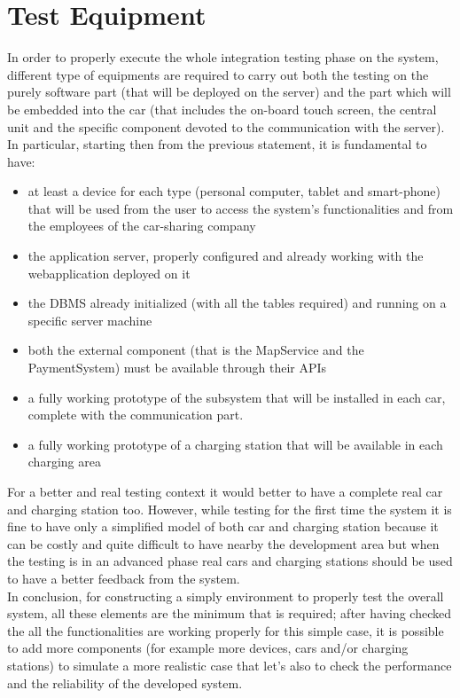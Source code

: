 \documentclass[11pt,a4paper]{report}
\begin{document}
\section{Test Equipment}
In order to properly execute the whole integration testing phase on the system, different type of equipments are required to carry out both the testing on the purely software part (that will be deployed on the server) and the part which will be embedded into the car (that includes the on-board touch screen, the central unit and the specific component devoted to the communication with the server). \\
In particular, starting then from the previous statement, it is fundamental to have:
\begin{itemize}
	\item at least a device for each type (personal computer, tablet and smart-phone) that will be used from the user to access the system's functionalities and from the employees of the car-sharing company
	\item the application server, properly configured and already working with the webapplication deployed on it
	\item the DBMS already initialized (with all the tables required) and running on a specific server machine
	\item both the external component (that is the MapService and the PaymentSystem) must be available through their APIs
	\item a fully working prototype of the subsystem that will be installed in each car, complete with the communication part.
	\item a fully working prototype of a charging station that will be available in each charging area
\end{itemize}
For a better and real testing context it would better to have a complete real car and charging station too. However, while testing for the first time the system it is fine to have only a simplified model of both car and charging station because it can be costly and quite difficult to have nearby the development area but when the testing is in an advanced phase real cars and charging stations should be used to have a better feedback from the system.\\
In conclusion, for constructing a simply environment to properly test the overall system, all these elements are the minimum that is required; after having checked the all the functionalities are working properly for this simple case, it is possible to add more components (for example more devices, cars and/or charging stations) to simulate a more realistic case that let's also to check the performance and the reliability of the developed system.
\end{document}
